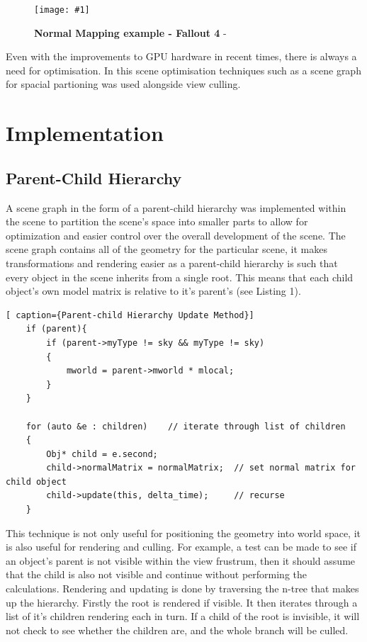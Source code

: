 \documentclass[conference]{acmsiggraph}
\newcommand{\figuremacroW}[4]{
	\begin{figure}[h] %
		\centering
		\texttt{[image: \#1]}
		\caption[#2]{\textbf{#2} - #3}
		\label{fig:#1}
	\end{figure}
}
\begin{document}
\figuremacroW
{fallout}
{Normal Mapping example - Fallout 4}
{\protect\cite{Fallout4}}
{1.0}

Even with the improvements to GPU hardware in recent times, there is always a need for optimisation. In this scene optimisation techniques such as a scene graph for spacial partioning was used alongside view culling.

\section{Implementation}

\subsection{Parent-Child Hierarchy}

A scene graph in the form of a parent-child hierarchy was implemented within the scene to partition the scene's space into smaller parts to allow for optimization and easier control over the overall development of the scene. The scene graph contains all of the geometry for the particular scene, it makes transformations and rendering easier as a parent-child hierarchy is such that every object in the scene inherits from a single root. This means that each child object's own model matrix is relative to it's parent's (see Listing 1).

\begin{lstlisting}[ caption={Parent-child Hierarchy Update Method}]
 	if (parent){
		if (parent->myType != sky && myType != sky)
		{
			mworld = parent->mworld * mlocal;
		}
	}

	for (auto &e : children)    // iterate through list of children
	{
		Obj* child = e.second;
		child->normalMatrix = normalMatrix;  // set normal matrix for child object 
		child->update(this, delta_time);     // recurse
	}
\end{lstlisting}

This technique is not only useful for positioning the geometry into world space, it is also useful for rendering and culling. For example, a test can be made to see if an object's parent is not visible within the view frustrum, then it should assume that the child is also not visible and continue without performing the calculations.
Rendering and updating is done by traversing the n-tree that makes up the hierarchy. Firstly the root is rendered if visible. It then iterates through a list of it's children rendering each in turn. If a child of the root is invisible, it will not check to see whether the children are, and the whole branch will be culled. 
\end{document}
